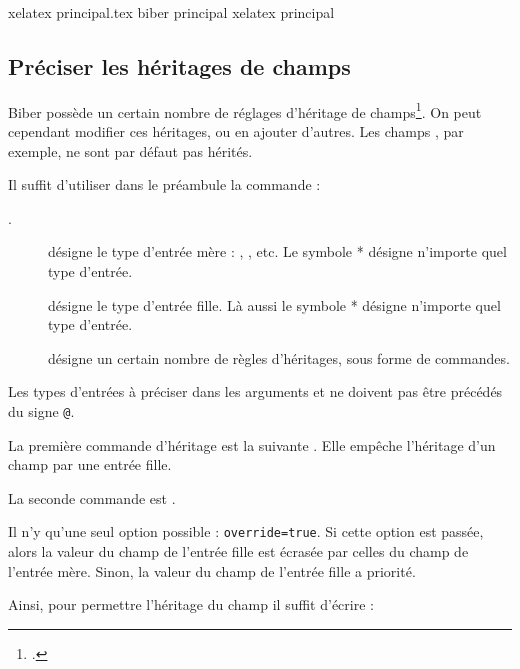 \begin{bashcode}
xelatex principal.tex
biber principal
xelatex principal
\end{bashcode}

\subsection{Préciser les héritages de champs}

Biber possède un certain nombre de réglages d'héritage de champs\footcite{biblatex_crossrefsetup}. On peut cependant modifier ces héritages, ou en ajouter d'autres. Les champs , par exemple, ne sont par défaut pas hérités. 

Il suffit d'utiliser dans le préambule la commande :

.

\begin{description}
\item[] désigne le type d'entrée mère : , , etc. Le symbole * désigne n'importe quel type d'entrée.
\item[] désigne le type d'entrée fille. Là aussi le symbole * désigne n'importe quel type d'entrée.
\item[] désigne un certain nombre de règles d'héritages, sous forme de commandes.
\end{description}

Les types d'entrées à préciser dans les arguments  et  ne doivent pas être précédés du signe \verb|@|.

La première commande d'héritage est la suivante .
Elle empêche l'héritage d'un champ par une entrée fille.

La seconde commande est 
.

Il n'y qu'une seul option possible : \verb|override=true|. Si cette option est passée, alors la valeur du champ de l'entrée fille est écrasée par celles du champ de l'entrée mère. Sinon, la valeur  du champ de l'entrée fille a priorité.

Ainsi, pour permettre l'héritage du  champ  il suffit d'écrire :

\begin{latexcode}
\end{latexcode}

